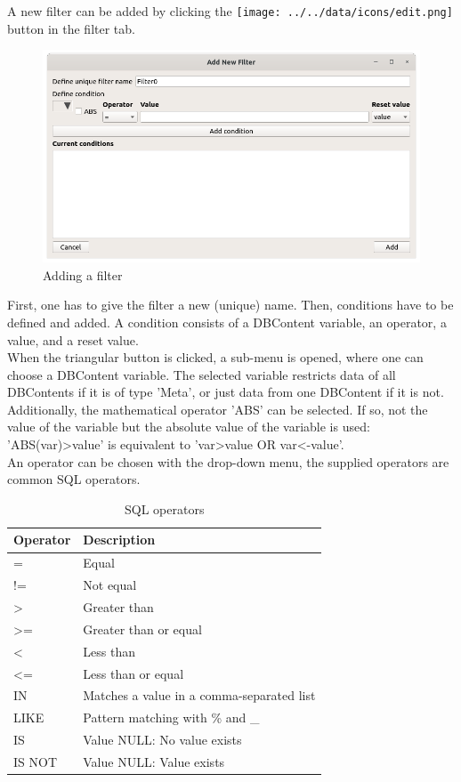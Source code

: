 A new filter can be added by clicking the \texttt{[image: ../../data/icons/edit.png]} button in the filter tab.

\begin{figure}[H]
  \center
    \includegraphics[width=14cm]{figures/filter_add.png}
  \caption{Adding a filter}
\end{figure}

First, one has to give the filter a new (unique) name. Then, conditions have to be defined and added. A condition consists of a DBContent variable, an operator, a value, and a reset value. \\

When the triangular button is clicked, a sub-menu is opened, where one can choose a DBContent variable. The selected variable restricts data of all DBContents if it is of type 'Meta', or just data from one DBContent if it is not. Additionally, the mathematical operator 'ABS' can be selected. If so, not the value of the variable but the absolute value of the variable is used: 'ABS(var)>value' is equivalent to 'var>value OR var<-value'. \\

An operator can be chosen with the drop-down menu, the supplied operators are common SQL operators.

\begin{table}[H]
  \center
  \begin{tabular}{ | l | l |}
    \hline
    \textbf{Operator} & \textbf{Description} \\ \hline
    = & Equal \\ \hline
    != & Not equal \\ \hline
    > & Greater than \\ \hline
    >= & Greater than or equal \\ \hline
    < & Less than \\ \hline
    <= & Less than or equal \\ \hline
    IN & Matches a value in a comma-separated list \\ \hline
    LIKE & Pattern matching with \% and \_ \\ \hline
    IS & Value NULL: No value exists \\ \hline
    IS NOT & Value NULL: Value exists \\
    \hline
  \end{tabular}
  \caption{SQL operators}
\end{table}

